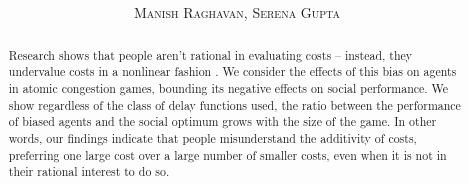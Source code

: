 \documentclass[twoside]{article}
\title{\vspace{-15mm}\fontsize{24pt}{10pt}\selectfont\textbf{\titlee}} %
\author{
\large
\textsc{Manish Raghavan, Serena Gupta}
\vspace{-5mm}
}
\begin{document}
\maketitle %

\thispagestyle{fancy} %

\begin{abstract}

  Research shows that people aren't rational in evaluating costs -- instead,
  they undervalue costs in a nonlinear fashion
  \cite{Kahneman1979}. We consider the effects of this bias on agents in atomic congestion
  games, bounding its negative effects on social performance. We show regardless
  of the class of delay functions used, the ratio between the performance of
  biased agents and the social optimum grows with the size of the game. In other words, our findings indicate that people misunderstand the additivity of
  costs, preferring one large cost over a large number of smaller costs, even
  when it is not in their rational interest to do so.

\end{abstract}
\end{document}
